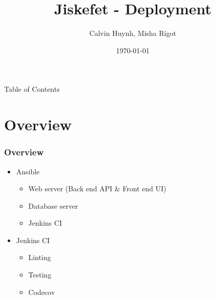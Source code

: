 \documentclass[12pt]{beamer}
\title{Jiskefet - Deployment}
\author{Calvin Huynh, Misha Rigot}
\date{\today}
\begin{document}
	\begin{frame}
	    \titlepage
	\end{frame}

	\begin{frame}{Table of Contents}
		\tableofcontents
	\end{frame}

	\section{Overview}
	\begin{frame}
        \frametitle{Overview}
		\begin{itemize}
			\item Ansible
			\begin{itemize}
                \item Web server (Back end API & Front end UI)
                \item Database server
                \item Jenkins CI
            \end{itemize} 
			\item Jenkins CI
            \begin{itemize}
                \item Linting
                \item Testing
                \item Codecov
            \end{itemize}
		\end{itemize}
    \end{frame}

\end{document}
